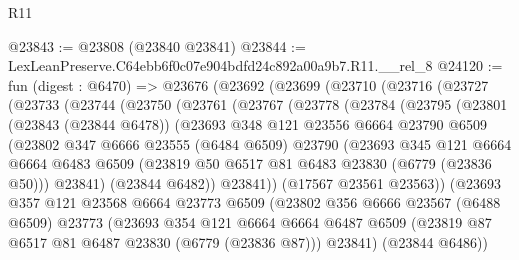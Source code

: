 \begin{lexlean}{R11}
\begin{coremodule}
@23843 := @23808 (@23840 @23841)
@23844 := LexLeanPreserve.C64ebb6f0c07e904bdfd24c892a00a9b7.R11.__rel_8
@24120 := fun (digest : @6470) =>
  @23676
    (@23692
      (@23699
        (@23710
          (@23716
            (@23727
              (@23733
                (@23744
                  (@23750
                    (@23761
                      (@23767
                        (@23778
                          (@23784
                            (@23795
                              (@23801
                                (@23843 (@23844 @6478))
                                (@23693
                                  @348
                                  @121
                                  @23556
                                  @6664
                                  @23790
                                  @6509
                                  (@23802
                                    @347
                                    @6666
                                    @23555
                                    (@6484 @6509)
                                    @23790
                                    (@23693
                                      @345
                                      @121
                                      @6664
                                      @6664
                                      @6483
                                      @6509
                                      (@23819 @50 @6517 @81 @6483 @23830 (@6779 (@23836 @50)))
                                      @23841)
                                    (@23844 @6482))
                                  @23841))
                              (@17567 @23561 @23563))
                            (@23693
                              @357
                              @121
                              @23568
                              @6664
                              @23773
                              @6509
                              (@23802
                                @356
                                @6666
                                @23567
                                (@6488 @6509)
                                @23773
                                (@23693
                                  @354
                                  @121
                                  @6664
                                  @6664
                                  @6487
                                  @6509
                                  (@23819 @87 @6517 @81 @6487 @23830 (@6779 (@23836 @87)))
                                  @23841)
                                (@23844 @6486))

\end{coremodule}
\end{lexlean}
